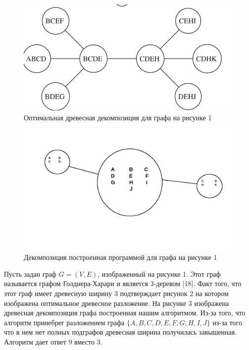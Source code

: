 \documentclass[a4paper,12pt]{article}
\begin{document}
\begin{large}
\begin{large}
		\begin{figure}[htbp]
			\centering
				\includegraphics[scale=0.4]{prog_decomp.png}
				\caption{Оптимальная древесная декомпозиция для графа на рисунке 1}
				\label{fig:testImage}
		\end{figure}

		\begin{figure}[htbp]
			\centering
				\includegraphics[scale=0.4]{decomp_of_prog.png}
				\caption{Декомпозиция построенная программой для графа на рисунке 1}
				\label{fig:testImage}
		\end{figure}

		Пусть задан граф  $G=(V, E)$, изображенный на рисунке 1. Этот граф называется графом Голднера-Харари и является 3-деревом [18]. 
		Факт того, что этот граф имеет древесную ширину 3 подтверждает рисунок 2 на котором изображена оптимальное древесное разложение.
		На рисунке 3 изображена древесная декомпозиция графа построенная нашим алгоритмом.
		Из-за того, что алгоритм принебрег разложением графа $\{A, B, C, D, E, F, G, H, I, J\}$ из-за того что в нем нет полных подграфов древесная ширина получилась завышенная. Алгоритм дает ответ $9$ вместо $3$.


\end{large}
\end{large}
\end{document}
